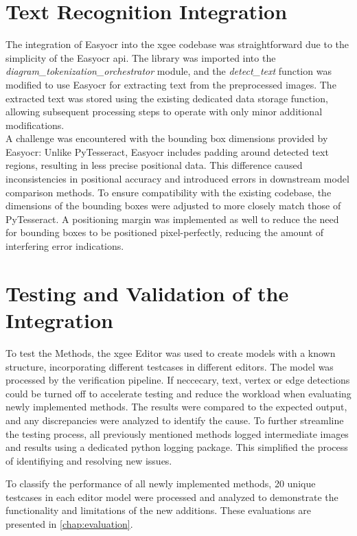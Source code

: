 \section{Text Recognition Integration}
The integration of Easy\acrshort{ocr} into the \acrshort{xgee} codebase was straightforward due to the simplicity of the Easy\acrshort{ocr} \acrshort{api}. The library was imported into the \textit{diagram\_tokenization\_orchestrator} module, and the \textit{detect\_text} function was modified to use Easy\acrshort{ocr} for extracting text from the preprocessed images. The extracted text was stored using the existing dedicated data storage function, allowing subsequent processing steps to operate with only minor additional modifications.\\
A challenge was encountered with the bounding box dimensions provided by Easy\acrshort{ocr}: Unlike PyTesseract, Easy\acrshort{ocr} includes padding around detected text regions, resulting in less precise positional data. This difference caused inconsistencies in positional accuracy and introduced errors in downstream model comparison methods. To ensure compatibility with the existing codebase, the dimensions of the bounding boxes were adjusted to more closely match those of PyTesseract. A positioning margin was implemented as well to reduce the need for bounding boxes to be positioned pixel-perfectly, reducing the amount of interfering error indications.

\section{Testing and Validation of the Integration}
To test the Methods, the \acrshort{xgee} Editor was used to create models with a known structure, incorporating different testcases in different editors. The model was processed by the verification pipeline. If neccecary, text, vertex or edge detections could be turned off to accelerate testing and reduce the workload when evaluating newly implemented methods. The results were compared to the expected output, and any discrepancies were analyzed to identify the cause. To further streamline the testing process, all previously mentioned methods logged intermediate images and results using a dedicated python logging package. This simplified the process of identifiying and resolving new issues.

To classify the performance of all newly implemented methods, 20 unique testcases in each editor model were processed and analyzed to demonstrate the functionality and limitations of the new additions. These evaluations are presented in \autoref{chap:evaluation}.